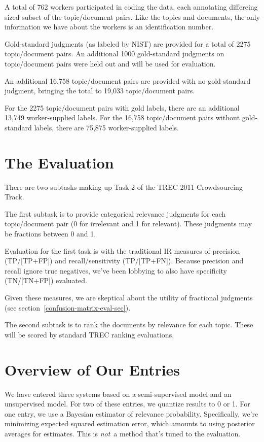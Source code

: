 \documentclass{article}
\begin{document}
A total of 762 workers participated in coding the data, each
annotating differeing sized subset of the topic/document pairs.  Like
the topics and documents, the only information we have about the
workers is an identification number.

Gold-standard judgments (as labeled by NIST) are provided for a total of
2275 topic/document pairs.  An additional 1000 gold-standard judgments
on topic/document pairs were held out and will be used for evaluation.

An additional 16,758 topic/document pairs
are provided with no gold-standard judgment, bringing the total to
19,033 topic/document pairs. 

For the 2275 topic/document pairs with gold labels, there are an
additional 13,749 worker-supplied labels.  For the 16,758
topic/document pairs without gold-standard labels, there are
75,875 worker-supplied labels.


\section{The Evaluation}

There are two subtasks making up Task 2 of the TREC 2011 Crowdsourcing
Track.  

The first subtask is to provide categorical relevance judgments for
each topic/document pair (0 for irrelevant and 1 for relevant).
These judgments may be fractions between 0 and 1.

Evaluation for the first task is with the traditional IR measures of
precision (TP/[TP+FP]) and recall/sensitivity (TP/[TP+FN]).  Because
precision and recall ignore true negatives, we've been lobbying to
also have specificity (TN/[TN+FP]) evaluated.  

Given these measures, we are skeptical about the utility of fractional
judgments (see section~\ref{confusion-matrix-eval-sec}).  

The second subtask is to rank the documents by relevance for each
topic.  These will be scored by standard TREC ranking evaluations.


\section{Overview of Our Entries}

We have entered three systems based on a semi-supervised model and an
unsupervised model.  For two of these entries, we quantize results to
0 or 1.  For one entry, we use a Bayesian estimator of relevance
probability.  Specifically, we're minimizing expected squared
estimation error, which amounts to using posterior averages for
estimates.  This is {\it not}\ a method that's tuned to the
evaluation.
\end{document}
